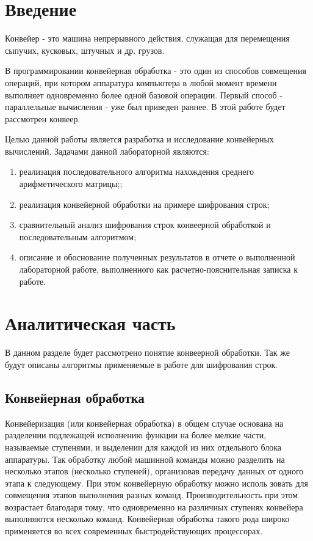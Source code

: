 \chapter*{Введение}\label{Input}


Конвейер - это машина непрерывного действия, служащая для перемещения сыпучих, кусковых, штучных и др. грузов.

В программировании конвейерная обработка - это один из способов совмещения операций, при котором аппаратура компьютера 
в любой момент времени выполняет одновременно более одной базовой операции. 
Первый способ - параллельные вычисления - уже был приведен раннее. В этой работе будет рассмотрен конвеер.

Целью данной работы является разработка и исследование конвейерных вычислений.
Задачами данной лабораторной являются:
\begin{enumerate}
  \item реализация последовательного алгоритма нахождения среднего арифметического матрицы;;
  \item реализация конвейерной обработки на примере шифрования строк;
  \item сравнительный анализ шифрования строк конвеерной обработкой и последовательным алгоритмом;
  \item описание и обоснование полученных результатов в отчете о выполненной лабораторной работе, выполненного как расчетно-пояснительная 
        записка к работе.
\end{enumerate}

\chapter{Аналитическая часть}\label{Analis}

В данном разделе будет рассмотрено понятие конвеерной обработки. Так же будут описаны алгоритмы применяемые в работе для шифрования строк. 

\section{Конвейерная обработка}\label{BubbleSort}

Конвейеризация (или конвейерная обработка) в общем случае основана на разделении подлежащей исполнению функции на более мелкие части, 
называемые ступенями, и выделении для каждой из них отдельного блока аппаратуры. Так обработку любой машинной команды можно разделить на 
несколько этапов (несколько ступеней), организовав передачу данных от одного этапа к следующему. При этом конвейерную обработку можно исполь
зовать для совмещения этапов выполнения разных команд. Производительность при этом возрастает благодаря тому, что одновременно на различных ступенях конвейера выполняются несколько команд. Конвейерная обработка такого рода широко применяется во всех современных быстродействующих
процессорах.


